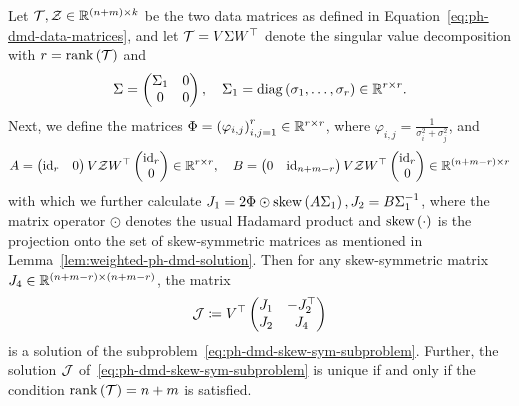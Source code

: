 \begin{theorem}
    Let $\mcl{T}, \mcl{Z} \in \bb{R}^{(n + m) \times k}$ be the two data matrices as defined in Equation~\eqref{eq:ph-dmd-data-matrices}, and let $\mcl{T} = V \Sigma W\trans$ denote the singular value decomposition with $r = \rank{\mcl{T}}$ and
    \begin{equation*}
        \Sigma = \begin{pmatrix}
            \Sigma_1 & 0 \\
            0 & 0
        \end{pmatrix},\quad \Sigma_1 = \diag{\sigma_1, \dots, \sigma_r} \in \bb{R}^{r \times r}.
    \end{equation*}
    Next, we define the matrices $\Phi = {(\varphi_{i, j})}_{i, j = 1}^r \in \bb{R}^{r \times r}$, where $\varphi_{i, j} = \frac{1}{\sigma_i^2 + \sigma_j^2}$, and
    \begin{equation*}
        A = \begin{pmatrix}
            \id[r] & 0
        \end{pmatrix} V \mcl{Z} W\trans \begin{pmatrix}
            \id[r] \\
            0
        \end{pmatrix} \in \bb{R}^{r \times r},\quad B = \begin{pmatrix}
            0 & \id[n + m - r]
        \end{pmatrix} V \mcl{Z} W\trans \begin{pmatrix}
            \id[r] \\
            0
        \end{pmatrix} \in \bb{R}^{(n + m - r) \times r}
    \end{equation*}
    with which we further calculate $J_1 = 2 \Phi \odot \sksym{A \Sigma_1}, J_2 = B \Sigma_1\inv$, where the matrix operator $\odot$ denotes the usual Hadamard product and $\sksym{\cdot}$ is the projection onto the set of skew-symmetric matrices as mentioned in Lemma~\ref{lem:weighted-ph-dmd-solution}.
    Then for any skew-symmetric matrix $J_4 \in \bb{R}^{(n + m - r) \times (n + m - r)}$, the matrix
    \begin{equation*}
        \mcl{J} \coloneqq V\trans \begin{pmatrix}
            J_1 & -J_2\trans \\
            J_2 & J_4
        \end{pmatrix}
    \end{equation*}
    is a solution of the subproblem~\eqref{eq:ph-dmd-skew-sym-subproblem}.
    Further, the solution $\mcl{J}$ of~\eqref{eq:ph-dmd-skew-sym-subproblem} is unique if and only if the condition $\rank{\mcl{T}} = n + m$ is satisfied.
\end{theorem}


